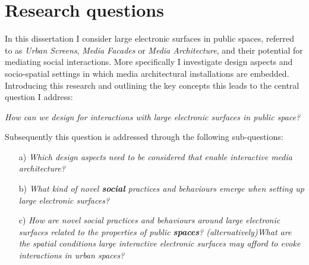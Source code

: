 
\section{Research questions}

In this dissertation I consider large electronic surfaces in public spaces, referred to as \textit{Urban Screens}, \textit{Media Facades} or \textit{Media Architecture}, and their potential for mediating social interactions. More specifically I investigate  design aspects and socio-spatial settings in which media architectural installations are embedded. Introducing this research and outlining the key concepts this leads to the central question I address:
  
  \textit{How can we design for interactions with large electronic surfaces in public space?}

 
\noindent Subsequently this question is addressed through the following sub-questions:
  
  \begin{enumerate}
  
  \item  [a)] \textit{Which design aspects need to be considered that enable interactive media architecture?}
 
 \item  [b)] \textit{What kind of novel \textbf{social} practices and behaviours emerge when setting up large electronic surfaces?}
 
 \item  [c)] \textit{How are novel social practices and behaviours around large electronic surfaces related to the properties of public \textbf{spaces}?
(alternatively)What are the spatial conditions large interactive electronic surfaces may afford to evoke interactions in urban spaces?}

\end{enumerate}


